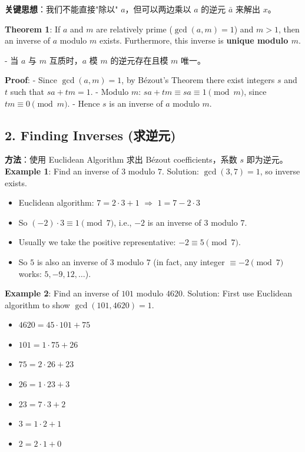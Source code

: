 \documentclass[10pt,a4paper,openany]{ctexbook}
\theoremstyle{definition}
\theoremstyle{remark}
\renewenvironment{quote}
  {\list{}{\leftmargin=1em\rightmargin=0pt\topsep=0.5pt\partopsep=0pt}\item[]}
  {\endlist}
\begin{document}
\begin{quote}
\textbf{关键思想}：我们不能直接"除以" $a$，但可以两边乘以 $a$ 的逆元 $\bar{a}$ 来解出 $x$。

\textbf{Theorem 1}: If $a$ and $m$ are relatively prime ($\gcd(a,m) = 1$) and $m > 1$, then an inverse of $a$ modulo $m$ exists. Furthermore, this inverse is \textbf{unique modulo $m$}.

- 当 $a$ 与 $m$ 互质时，$a$ 模 $m$ 的逆元存在且模 $m$ 唯一。

\textbf{Proof}:
- Since $\gcd(a,m) = 1$, by B\'ezout's Theorem there exist integers $s$ and $t$ such that $sa + tm = 1$.
- Modulo $m$: $sa + tm \equiv sa \equiv 1 \pmod{m}$, since $tm \equiv 0 \pmod{m}$.
- Hence $s$ is an inverse of $a$ modulo $m$.

\end{quote}
\vspace{-2pt}

\subsection{2. Finding Inverses (求逆元)}

\textbf{方法}：使用 Euclidean Algorithm 求出 B\'ezout coefficients，系数 $s$ 即为逆元。
\textbf{Example 1}: Find an inverse of $3$ modulo $7$.
Solution: $\gcd(3,7) = 1$, so inverse exists.
\begin{itemize}
\item Euclidean algorithm: $7 = 2 \cdot 3 + 1$  $\Rightarrow$ $1 = 7 - 2 \cdot 3$
\item So $(-2) \cdot 3 \equiv 1 \pmod{7}$, i.e., $-2$ is an inverse of $3$ modulo $7$.
\item Usually we take the positive representative: $-2 \equiv 5 \pmod{7}$.
\item So $5$ is also an inverse of $3$ modulo $7$ (in fact, any integer $\equiv -2 \pmod{7}$ works: $5, -9, 12, \dots$).

\end{itemize}

\textbf{Example 2}: Find an inverse of $101$ modulo $4620$.
Solution: First use Euclidean algorithm to show $\gcd(101, 4620) = 1$.
\begin{itemize}
\item $4620 = 45 \cdot 101 + 75$
\item $101 = 1 \cdot 75 + 26$
\item $75 = 2 \cdot 26 + 23$
\item $26 = 1 \cdot 23 + 3$
\item $23 = 7 \cdot 3 + 2$
\item $3 = 1 \cdot 2 + 1$
\item $2 = 2 \cdot 1 + 0$

\end{itemize}
\end{document}
